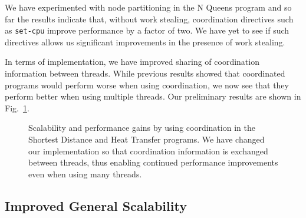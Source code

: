 \documentclass[10pt]{article}
\begin{document}
We have experimented with node partitioning in the N Queens program and
so far the results indicate that, without work stealing, coordination directives
such as \texttt{set-cpu} improve performance by a factor of two. We have
yet to see if such directives allows us significant improvements in the presence
of work stealing.

In terms of implementation, we have improved sharing of coordination
information between threads. While previous results showed that
coordinated programs would perform worse when using coordination, we now see
that they perform better when using multiple threads. Our preliminary
results are shown in Fig.~\ref{fig:coord_others}.

\begin{figure}[hb]
\begin{center}
\end{center}
\caption{Scalability and performance gains by using coordination in the Shortest
Distance and Heat Transfer programs. We have changed our implementation so that
coordination information is exchanged between threads, thus enabling
continued performance improvements even when using many threads.}
\label{fig:coord_others}
\end{figure}

\subsection{Improved General Scalability}
\end{document}
